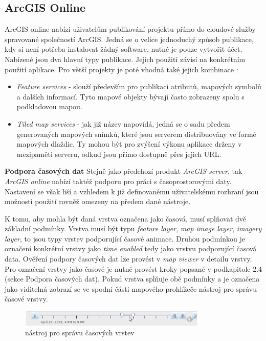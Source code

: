 \subsection{ArcGIS Online}

ArcGIS online nabízí uživatelům publikování projektu přímo do cloudové
služby spravované společností ArcGIS. Jedná se o velice jednoduchý
způsob publikace, kdy si není potřeba instalovat žádný software, nutné
je pouze vytvořit účet. Nabízené jsou dva hlavní typy
publikace. Jejich použití závisí na konkrétním použití aplikace. Pro
větší projekty je poté vhodná také jejich kombinace
\cite{arcgis-publishing-service}:
\begin{itemize}
	\item \textit{Feature services} - slouží především pro
publikaci atributů, mapových symbolů a dalších informací. Tyto mapové
objekty bývají často zobrazeny spolu s podkladovou mapou.
	\item \textit{Tiled map services} - jak již název napovídá,
jedná se o sadu předem generovaných mapových snímků, které jsou
serverem distribuovány ve formě mapových dlaždic. Ty mohou být pro
zvýšení výkonu aplikace drženy v mezipaměti serveru, odkud jsou přímo
dostupně přes jejich URL.
\end{itemize}

\bigskip
\noindent \textbf{Podpora časových dat} Stejně jako předchozí produkt
\textit{ArcGIS server}, tak \textit{ArcGIS online} nabízí taktéž
podporu pro práci s časoprostorovými daty. Nastavení se však liší a
vzhledem k již definovanému uživatelskému rozhraní jsou možnosti
použití rovněž omezeny na předem dané nástroje.

K tomu, aby mohla být daná vrstva označena jako časová, musí splňovat
dvě základní podmínky. Vrstva musí být typu \textit{feature layer},
\textit{map image layer}, \textit{imagery layer}, to jsou typy vrstev
podporující časové animace. Druhou podmínkou je označení konkrétní
vrstvy jako \textit{time enabled} tedy jako vrstvu podporující časová
data. Ověření podpory časových dat lze provést v \textit{map viewer} v
detailu vrstvy. Pro označení vrstvy jako časové je nutné provést kroky
popsané v podkapitole 2.4 (sekce Podpora časových dat). Pokud vrstva
splňuje obě podmínky a je označena jako viditelná zobrazí se ve spodní
části mapového prohlížeče nástroj pro správu časové vrstvy.

\begin{figure}[h!]  \centering
\includegraphics[width=0.8\textwidth]{../img/arcgis-online-time-slider.png}
	\caption{nástroj pro správu časových vrstev}
	\label{fig:arcgis-time-settings}
\end{figure}

